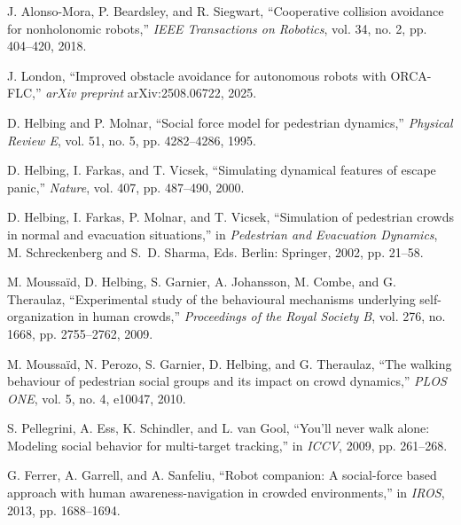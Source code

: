 \documentclass[12pt,a4paper,oneside]{book}
\begin{document}
\begin{enumerate}[label={[\arabic*]}, leftmargin=*]
\item \label{Alonso2018} J. Alonso-Mora, P. Beardsley, and R. Siegwart, ``Cooperative collision avoidance for nonholonomic robots,'' \emph{IEEE Transactions on Robotics}, vol. 34, no. 2, pp. 404--420, 2018.

\item \label{London2025} J. London, ``Improved obstacle avoidance for autonomous robots with ORCA-FLC,'' \emph{arXiv preprint} arXiv:2508.06722, 2025.

\item \label{Helbing1995} D. Helbing and P. Molnar, ``Social force model for pedestrian dynamics,'' \emph{Physical Review E}, vol. 51, no. 5, pp. 4282--4286, 1995.

\item \label{Helbing2000} D. Helbing, I. Farkas, and T. Vicsek, ``Simulating dynamical features of escape panic,'' \emph{Nature}, vol. 407, pp. 487--490, 2000.

\item \label{Helbing2002} D. Helbing, I. Farkas, P. Molnar, and T. Vicsek, ``Simulation of pedestrian crowds in normal and evacuation situations,'' in \emph{Pedestrian and Evacuation Dynamics}, M. Schreckenberg and S.~D. Sharma, Eds. Berlin: Springer, 2002, pp. 21--58.

\item \label{Moussaid2009} M. Moussaïd, D. Helbing, S. Garnier, A. Johansson, M. Combe, and G. Theraulaz, ``Experimental study of the behavioural mechanisms underlying self-organization in human crowds,'' \emph{Proceedings of the Royal Society B}, vol. 276, no. 1668, pp. 2755--2762, 2009.

\item \label{Moussaid2010} M. Moussaïd, N. Perozo, S. Garnier, D. Helbing, and G. Theraulaz, ``The walking behaviour of pedestrian social groups and its impact on crowd dynamics,'' \emph{PLOS ONE}, vol. 5, no. 4, e10047, 2010.

\item \label{Pellegrini2009} S. Pellegrini, A. Ess, K. Schindler, and L. van Gool, ``You'll never walk alone: Modeling social behavior for multi-target tracking,'' in \emph{ICCV}, 2009, pp. 261--268.

\item \label{Ferrer2013} G. Ferrer, A. Garrell, and A. Sanfeliu, ``Robot companion: A social-force based approach with human awareness-navigation in crowded environments,'' in \emph{IROS}, 2013, pp. 1688--1694.


\end{enumerate}
\end{document}
